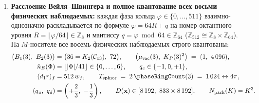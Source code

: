 \begin{theorem}
\begin{enumerate}[label=\textbf{(\arabic*)},leftmargin=*]
\item \textbf{Расслоение Вейля--Швингера и полное квантование всех восьми физических наблюдаемых:}
  каждая фаза кольца $\varphi \in \{0, \dots, 511\}$ взаимно-однозначно раскладывается по формуле $\varphi = 64 R + q$ на номер октантного уровня $R = \lfloor\varphi / 64\rfloor \in \mathbb{Z}_8$ и мантиссу $q = \varphi \bmod 64 \in \mathbb{Z}_{64}$ ($\mathbb{Z}_{512} \cong \mathbb{Z}_8 \times \mathbb{Z}_{64}$). На $M$-носителе все восемь физических наблюдаемых строго квантованы:
  \begin{align}
    \bigl(B_1(3),\ B_2(3)\bigr) &= \bigl(36 = K_2(\mathcal{C}_{13}),\ 72\bigr), \qquad
    \bigl(\mu_{\mathrm{vac}}(3),\ K_P(3)^2\bigr) \;=\; (1,\ 4\,096), \label{eq:mono-quant-obs-12} \\
    \hat{n}_E(\Phi) &= \lfloor|\Phi|/41\rfloor \in \{0,\dots,6\}, \qquad
    q_e \in \{-1, 0, +1\}, \label{eq:mono-quant-obs-34} \\
    (d_1 r)_f &= 512\,w_f, \qquad
    T_{\mathrm{spinor}} \;=\; 2\,\phaseRingCount(3) \;=\; 1\,024 \leftrightarrow 4\pi, \label{eq:mono-quant-obs-56} \\
    (q_u,\ q_d) &= \left(+\frac{2}{3},\ -\frac{1}{3}\right), \qquad
    D(\mathbf{x}) \in [8\,192,\ 833\times 8\,192], \qquad
    N_{\mathrm{pack}}(K) = K^3. \label{eq:mono-quant-obs-78}
  \end{align}
\end{enumerate}
\end{theorem}

